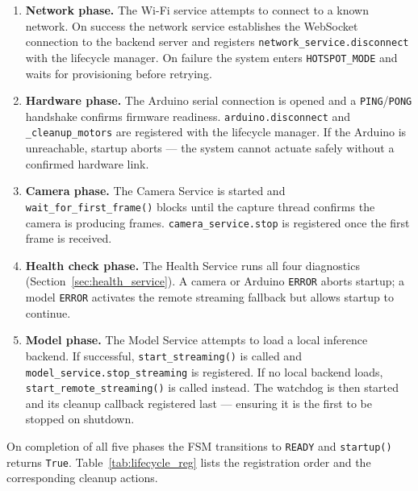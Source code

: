 \begin{enumerate}
	\item \textbf{Network phase.} The Wi-Fi service attempts to
	connect to a known network. On success the network service
	establishes the WebSocket connection to the backend server
	and registers \texttt{network\_service.disconnect} with the
	lifecycle manager. On failure the system enters
	\texttt{HOTSPOT\_MODE} and waits for provisioning before
	retrying.
	
	\item \textbf{Hardware phase.} The Arduino serial connection is
	opened and a \texttt{PING}/\texttt{PONG} handshake confirms
	firmware readiness. \texttt{arduino.disconnect} and
	\texttt{\_cleanup\_motors} are registered with the lifecycle
	manager. If the Arduino is unreachable, startup aborts —
	the system cannot actuate safely without a confirmed
	hardware link.
	
	\item \textbf{Camera phase.} The Camera Service is started and
	\texttt{wait\_for\_first\_frame()} blocks until the capture
	thread confirms the camera is producing frames.
	\texttt{camera\_service.stop} is registered once the first
	frame is received.
	
	\item \textbf{Health check phase.} The Health Service runs all
	four diagnostics (Section~\ref{sec:health_service}). A
	camera or Arduino \texttt{ERROR} aborts startup; a model
	\texttt{ERROR} activates the remote streaming fallback but
	allows startup to continue.
	
	\item \textbf{Model phase.} The Model Service attempts to load a
	local inference backend. If successful,
	\texttt{start\_streaming()} is called and
	\texttt{model\_service.stop\_streaming} is registered. If
	no local backend loads, \texttt{start\_remote\_streaming()}
	is called instead. The watchdog is then started and its
	cleanup callback registered last — ensuring it is the
	first to be stopped on shutdown.
\end{enumerate}

On completion of all five phases the FSM transitions to
\texttt{READY} and \texttt{startup()} returns \texttt{True}.
Table~\ref{tab:lifecycle_reg} lists the registration order and the
corresponding cleanup actions.

